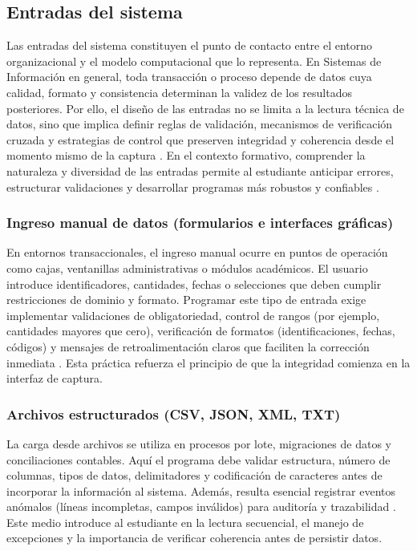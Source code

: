 \documentclass[12pt,twoside]{book}
\begin{document}
				\subsection{Entradas del sistema}
				\noindent
					Las entradas del sistema constituyen el punto de contacto entre el entorno organizacional y el modelo computacional que lo representa. En Sistemas de Información en general, toda transacción o proceso depende de datos cuya calidad, formato y consistencia determinan la validez de los resultados posteriores. Por ello, el diseño de las entradas no se limita a la lectura técnica de datos, sino que implica definir reglas de validación, mecanismos de verificación cruzada y estrategias de control que preserven integridad y coherencia desde el momento mismo de la captura \cite{Laudon2020Management,Kendall2014Systems,Sommerville2015Software}. En el contexto formativo, comprender la naturaleza y diversidad de las entradas permite al estudiante anticipar errores, estructurar validaciones y desarrollar programas más robustos y confiables \cite{Gaddis2022Starting,Hanly2015Problem}.
					
					\subsubsection{Ingreso manual de datos (formularios e interfaces gráficas)}
						\noindent
						En entornos transaccionales, el ingreso manual ocurre en puntos de operación como cajas, ventanillas administrativas o módulos académicos. El usuario introduce identificadores, cantidades, fechas o selecciones que deben cumplir restricciones de dominio y formato. Programar este tipo de entrada exige implementar validaciones de obligatoriedad, control de rangos (por ejemplo, cantidades mayores que cero), verificación de formatos (identificaciones, fechas, códigos) y mensajes de retroalimentación claros que faciliten la corrección inmediata \cite{Gaddis2022Starting,Hanly2015Problem,ISO247722024Programming}. Esta práctica refuerza el principio de que la integridad comienza en la interfaz de captura.
						
					\subsubsection{Archivos estructurados (CSV, JSON, XML, TXT)}
					\noindent
						La carga desde archivos se utiliza en procesos por lote, migraciones de datos y conciliaciones contables. Aquí el programa debe validar estructura, número de columnas, tipos de datos, delimitadores y codificación de caracteres antes de incorporar la información al sistema. Además, resulta esencial registrar eventos anómalos (líneas incompletas, campos inválidos) para auditoría y trazabilidad \cite{Pressman2019Software,Elmasri2016Database}. Este medio introduce al estudiante en la lectura secuencial, el manejo de excepciones y la importancia de verificar coherencia antes de persistir datos.
						
\end{document}
